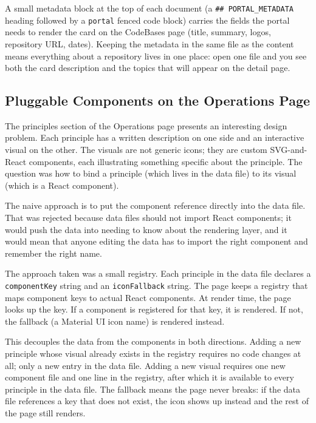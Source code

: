 A small metadata block at the top of each document (a \texttt{\#\# PORTAL\_METADATA} heading followed by a \texttt{portal} fenced code block) carries the fields the portal needs to render the card on the CodeBases page (title, summary, logos, repository URL, dates). Keeping the metadata in the same file as the content means everything about a repository lives in one place: open one file and you see both the card description and the topics that will appear on the detail page.

\subsection{Pluggable Components on the Operations Page}\label{subsec:dev-design-pluggable}

The principles section of the Operations page presents an interesting design problem. Each principle has a written description on one side and an interactive visual on the other. The visuals are not generic icons; they are custom SVG-and-React components, each illustrating something specific about the principle. The question was how to bind a principle (which lives in the data file) to its visual (which is a React component).

The naive approach is to put the component reference directly into the data file. That was rejected because data files should not import React components; it would push the data into needing to know about the rendering layer, and it would mean that anyone editing the data has to import the right component and remember the right name.

The approach taken was a small registry. Each principle in the data file declares a \texttt{componentKey} string and an \texttt{iconFallback} string. The page keeps a registry that maps component keys to actual React components. At render time, the page looks up the key. If a component is registered for that key, it is rendered. If not, the fallback (a Material UI icon name) is rendered instead.

This decouples the data from the components in both directions. Adding a new principle whose visual already exists in the registry requires no code changes at all; only a new entry in the data file. Adding a new visual requires one new component file and one line in the registry, after which it is available to every principle in the data file. The fallback means the page never breaks: if the data file references a key that does not exist, the icon shows up instead and the rest of the page still renders.

